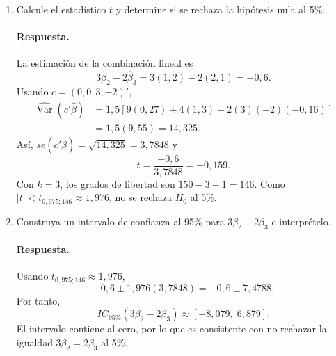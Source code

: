 \documentclass[letterpaper,11pt]{article}
\newcommand{\respuesta}{\color{blue}\paragraph{Respuesta.}}
\begin{document}
\begin{enumerate}[resume]
\begin{enumerate}[label=(\alph*)]
    \item\color{black} Calcule el estadístico $t$ y determine si se rechaza la hipótesis
    nula al 5\%.

    \respuesta La estimación de la combinación lineal es
    \[
        3\widehat\beta_2-2\widehat\beta_3
        =3(1{,}2)-2(2{,}1)=-0{,}6.
    \]
    Usando $c=(0,0,3,-2)'$,
    \[
    \begin{aligned}
        \widehat{\operatorname{Var}}(c'\widehat\beta)
        &=1{,}5\left[9(0{,}27)+4(1{,}3)
          +2(3)(-2)(-0{,}16)\right]\\
        &=1{,}5(9{,}55)=14{,}325.
    \end{aligned}
    \]
    Así, $se(c'\widehat\beta)=\sqrt{14{,}325}=3{,}7848$ y
    \[
        t=\frac{-0{,}6}{3{,}7848}=-0{,}159.
    \]
    Con $k=3$, los grados de libertad son $150-3-1=146$. Como
    $|t|<t_{0{,}975;146}\approx1{,}976$, no se rechaza $H_0$ al 5\%.

    \item\color{black} Construya un intervalo de confianza al 95\% para
    $3\beta_2-2\beta_3$ e interprételo.

    \respuesta Usando $t_{0{,}975;146}\approx1{,}976$,
    \[
        -0{,}6\pm1{,}976(3{,}7848)
        =-0{,}6\pm7{,}4788.
    \]
    Por tanto,
    \[
        IC_{95\%}(3\beta_2-2\beta_3)
        \approx[-8{,}079,\;6{,}879].
    \]
    El intervalo contiene al cero, por lo que es consistente con no rechazar
    la igualdad $3\beta_2=2\beta_3$ al 5\%.
\end{enumerate}

\end{enumerate}
\end{document}
